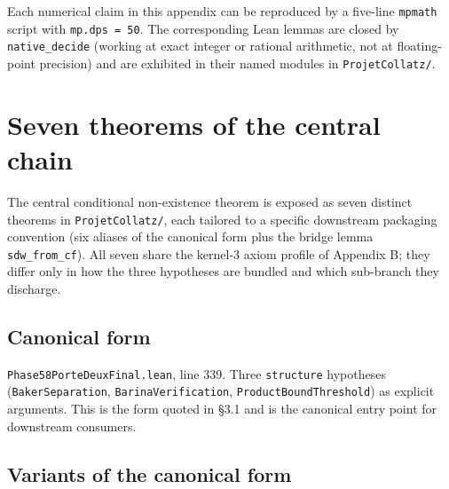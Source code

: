 \documentclass[
  11pt]{amsart}
\providecommand{\tightlist}{%
  \setlength{\itemsep}{0pt}\setlength{\parskip}{0pt}}
\theoremstyle{plain}
\theoremstyle{definition}
\theoremstyle{remark}
\begin{document}
Each numerical claim in this appendix can be reproduced by a five-line
\texttt{mpmath} script with \texttt{mp.dps\ =\ 50}. The corresponding
Lean lemmas are closed by \texttt{native\_decide} (working at exact
integer or rational arithmetic, not at floating-point precision) and are
exhibited in their named modules in \texttt{ProjetCollatz/}.

\section{Seven theorems of the central
chain}\label{seven-theorems-of-the-central-chain}

The central conditional non-existence theorem is exposed as seven
distinct theorems in \texttt{ProjetCollatz/}, each tailored to a
specific downstream packaging convention (six aliases of the canonical
form plus the bridge lemma \texttt{sdw\_from\_cf}). All seven share the
kernel-3 axiom profile of Appendix B; they differ only in how the three
hypotheses are bundled and which sub-branch they discharge.

\subsection{Canonical form}\label{canonical-form}

\begin{description}
\tightlist
\item[\texttt{ProjetCollatz.no\_nontrivial\_cycle\_final}]
\texttt{Phase58PorteDeuxFinal.lean}, line 339. Three \texttt{structure}
hypotheses (\texttt{BakerSeparation}, \texttt{BarinaVerification},
\texttt{ProductBoundThreshold}) as explicit arguments. This is the form
quoted in §3.1 and is the canonical entry point for downstream
consumers.
\end{description}

\subsection{Variants of the canonical
form}\label{variants-of-the-canonical-form}
\end{document}
